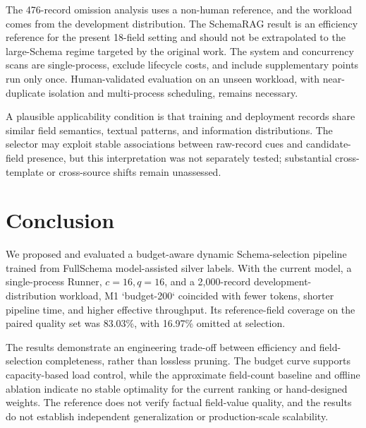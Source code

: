 \documentclass[runningheads]{llncs}
\newcommand{\method}{M1}
\newcommand{\full}{FullSchema}
\newcommand{\schemarag}{SchemaRAG}
\begin{document}
  The 476-record omission analysis uses a non-human reference, and the workload comes from the development distribution. The \schemarag{} result is an efficiency reference for the present 18-field setting and should not be extrapolated to the large-Schema regime targeted by the original work. The system and concurrency scans are single-process, exclude lifecycle costs, and include supplementary points run only once. Human-validated evaluation on an unseen workload, with near-duplicate isolation and multi-process scheduling, remains necessary.

 A plausible applicability condition is that training and deployment records share similar field semantics, textual patterns, and information distributions. The selector may exploit stable associations between raw-record cues and candidate-field presence, but this interpretation was not separately tested; substantial cross-template or cross-source shifts remain unassessed.

\section{Conclusion}

\begin{sloppypar}
\setlength{\emergencystretch}{4em}
We proposed and evaluated a budget-aware dynamic Schema-selection pipeline trained from \full{} model-assisted silver labels. With the current model, a single-process Runner, $c=16,q=16$, and a 2,000-record development-distribution workload, \method{} `budget-200` coincided with fewer tokens, shorter pipeline time, and higher effective throughput. Its reference-field coverage on the paired quality set was 83.03\%, with 16.97\% omitted at selection.
\end{sloppypar}

The results demonstrate an engineering trade-off between efficiency and field-selection completeness, rather than lossless pruning. The budget curve supports capacity-based load control, while the approximate field-count baseline and offline ablation indicate no stable optimality for the current ranking or hand-designed weights. The reference does not verify factual field-value quality, and the results do not establish independent generalization or production-scale scalability.



\end{document}
